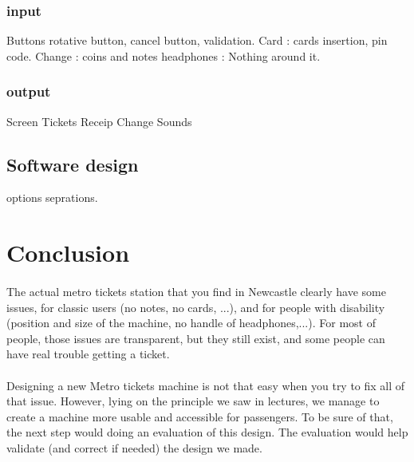 \documentclass[a4paper,12pt]{article} %
\begin{document}
\subsubsection{input}
Buttons  rotative button, cancel button, validation.
Card : cards insertion, pin code.
Change : coins and notes
headphones : Nothing around it.
\subsubsection{output}
Screen
Tickets
Receip
Change
Sounds
\subsection{Software design}
options seprations.


\newpage
\section*{Conclusion}
\paragraph{}The actual metro tickets station that you find in Newcastle clearly have some issues, for classic users (no notes, no cards, ...), and for people with disability (position and size of the machine, no handle of headphones,...). For most of people, those issues are transparent, but they still exist, and some people can have real trouble getting a ticket.
\paragraph{}Designing a new Metro tickets machine is not that easy when you try to fix all of that issue. However, lying on the principle we saw in lectures, we manage to create a machine more usable and accessible for passengers. To be sure of that, the next step would doing an evaluation of this design. The evaluation would help validate (and correct if needed) the design we made. 

\newpage
\nocite{Org}
\nocite{Wikipedia}


\end{document}
